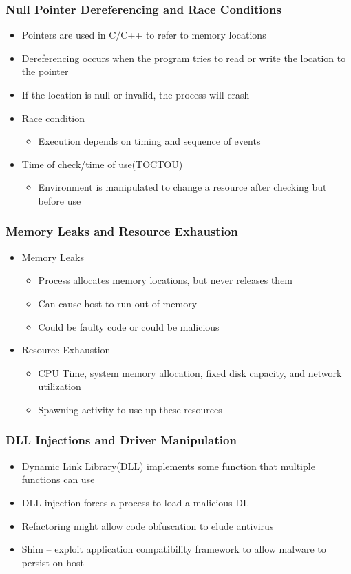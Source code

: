 		\subsubsection {Null Pointer Dereferencing and Race Conditions}
			\begin{itemize}
				\item Pointers are used in C/C++ to refer to memory locations
				\item Dereferencing occurs when the program tries to read or write the
					location to the pointer
				\item If the location is null or invalid, the process will crash
				\item Race condition
					\begin{itemize}
						\item Execution depends on timing and sequence of events
					\end{itemize}
				\item Time of check/time of use(TOCTOU)
					\begin{itemize}
						\item Environment is manipulated to change a resource after
							checking but before use
					\end{itemize}
			\end{itemize}
		\subsubsection {Memory Leaks and Resource Exhaustion}
			\begin{itemize}
				\item Memory Leaks
					\begin{itemize}
						\item Process allocates memory locations, but never releases them
						\item Can cause host to run out of memory
						\item Could be faulty code or could be malicious
					\end{itemize}
				\item Resource Exhaustion
					\begin{itemize}
						\item CPU Time, system memory allocation, fixed disk capacity,
							and network utilization
						\item Spawning activity to use up these resources
					\end{itemize}
			\end{itemize}
		\subsubsection {DLL Injections and Driver Manipulation}
			\begin{itemize}
				\item Dynamic Link Library(DLL) implements some function that multiple
					functions can use
				\item DLL injection forces a process to load a malicious DL
				\item Refactoring might allow code obfuscation to elude antivirus
				\item Shim -- exploit application compatibility framework to allow malware
					to persist on host
			\end{itemize}
